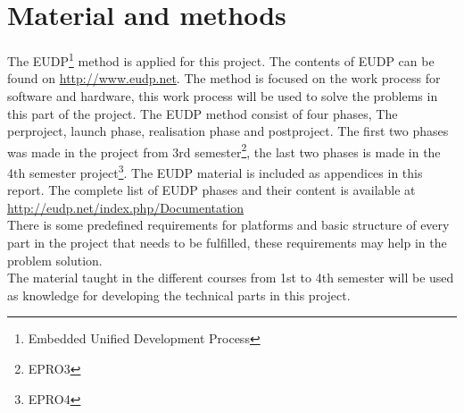 \chapter{Material and methods}
The EUDP\footnote{Embedded Unified Development Process} method is applied for this project. The contents of EUDP can be found on \url{http://www.eudp.net}. The method is focused on the work process for software and hardware, this work process will be used to solve the problems in this part of the project. The EUDP method consist of four phases, The perproject, launch phase, realisation phase and postproject. The first two phases was made in the project from 3rd semester\footnote{EPRO3}, the last two phases is made in the 4th semester project\footnote{EPRO4}. The EUDP material is included as appendices in this report. The complete list of EUDP phases and their content is available at \url{http://eudp.net/index.php/Documentation}\\
There is some predefined requirements for platforms and basic structure of every part in the project that needs to be fulfilled, these requirements may help in the problem solution.\\
The material taught in the different courses from 1st to 4th semester will be used as knowledge for developing the technical parts in this project.